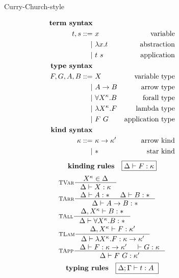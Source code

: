 \begin{figure}
\begin{singlespace}
\begin{minipage}{.46\textwidth}
        \begin{center}Curry-Church-style\end{center}
\def\baselinestretch{0}
\small
\begin{align*}
\textbf{term syntax} \\
t,s ::= &~ x           & \text{variable}    \\
      | &~ \lambda x    . t & \text{abstraction} \\
      | &~ t ~ s       & \text{application} \\
\textbf{type syntax} \\
F,G,A,B ::= &~ X                  & \text{variable type}    \\
          | &~ A -> B             & \text{arrow type}       \\   
          | &~ \forall X^\kappa.B & \text{forall type}      \\
          | &~ \lambda X^\kappa.F      & \text{lambda type}      \\
          | &~ F ~ G              & \text{application type} \\
\textbf{kind syntax} \\
\kappa ::= &~ \kappa -> \kappa' & \text{arrow kind} \\
         | &~ *                 & \text{star kind}   \\
\end{align*}
\[ \textbf{kinding rules} \quad \framebox{$ \Delta |- F:\kappa $} \]\vspace*{-1em}
\begin{align*}
& \inference[\sc TVar]{X^\kappa \in \Delta}{\Delta |- X:\kappa} \\
& \inference[\sc TArr]{\Delta |- A:* & \Delta |- B:*}{\Delta |- A -> B:*} \\
& \inference[\sc TAll]{\Delta,X^\kappa |- B:*}{\Delta |- \forall X^\kappa.B:*} \\
& \inference[\sc TLam]{\Delta,X^\kappa |- F:\kappa'}
                      {\Delta |- \l X^\kappa.F:\kappa -> \kappa'} \\
& \inference[\sc TApp]{\Delta |- F : \kappa -> \kappa' & |- G : \kappa}
                      {\Delta |- F ~ G : \kappa'} \\
\end{align*}
\[ \textbf{typing rules} \quad \framebox{$ \Delta;\Gamma |- t : A $ } \]
\vspace*{-1em}

\end{minipage}
\end{singlespace}
\end{figure}
